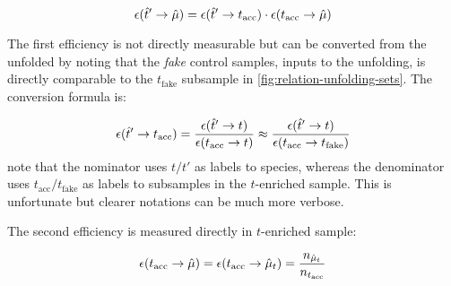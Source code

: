 \begin{equation}
    \misEff[\hat{t}']{\hat{\mu}} =
        \misEff[\hat{t}']{t_\text{acc}} \cdot \misEff[t_\text{acc}]{\hat{\mu}}
\end{equation}

The first efficiency  is not directly measurable
but can be converted from the unfolded 
by noting that the \emph{fake} \muon control samples,
inputs to the unfolding,
is directly comparable to the $t_\text{fake}$ subsample
in \cref{fig:relation-unfolding-sets}.
The conversion formula is:

\begin{equation}
    \misEff[\hat{t}']{t_\text{acc}} =
    \frac{
        \misEff[\hat{t}']{t}
    }{
        \misEff[t_\text{acc}]{t}
    } \approx
    \frac{
        \misEff[\hat{t}']{t}
    }{
        \misEff[t_\text{acc}]{t_\text{fake}}
    }
\end{equation}
note that the nominator uses $t/t'$ as labels to species, whereas the
denominator uses $t_\text{acc}/t_\text{fake}$ as labels to subsamples
in the $t$-enriched \pidcalib sample.
This is unfortunate but clearer notations can be much more verbose.

The second efficiency  is measured directly
in $t$-enriched \pidcalib sample:

\begin{equation}
    \misEff[t_\text{acc}]{\hat{\mu}} =
        \misEff[t_\text{acc}]{\hat{\mu}_t} =
        \frac{n_{\hat{\mu}_t}}{n_{t_\text{acc}}}
\end{equation}

